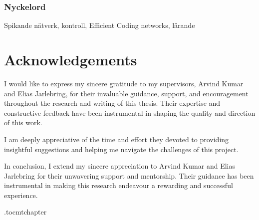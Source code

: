 \subsection*{Nyckelord}
Spikande nätverk, kontroll, Efficient Coding networks, lärande

\newpage
\thispagestyle{plain}
\chapter*{Acknowledgements}


I would like to express my sincere gratitude to my supervisors, Arvind Kumar and Elias Jarlebring, for their invaluable guidance, support, and encouragement throughout the research and writing of this thesis. Their expertise and constructive feedback have been instrumental in shaping the quality and direction of this work.

I am deeply appreciative of the time and effort they devoted to providing insightful suggestions and helping me navigate the challenges of this project.

In conclusion, I extend my sincere appreciation to Arvind Kumar and Elias Jarlebring for their unwavering support and mentorship. Their guidance has been instrumental in making this research endeavour a rewarding and successful experience.

\newpage



\newpage

\etocdepthtag.toc{mtchapter}
\thispagestyle{plain}
\tableofcontents

\newpage



